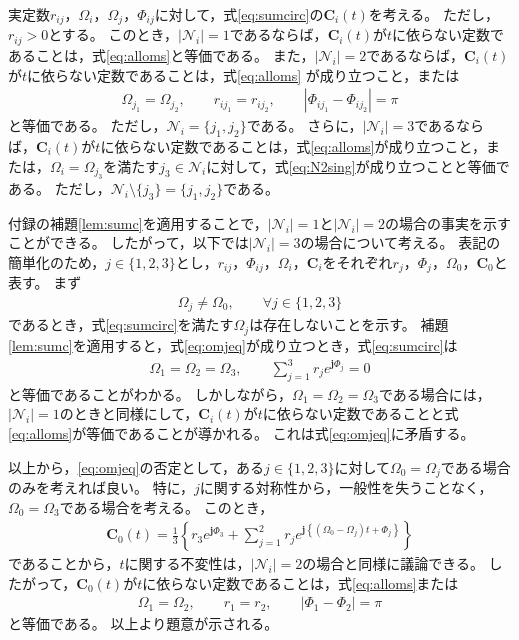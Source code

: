 \documentclass[tombow,dvipdfmx]{corona-a5-1.1}
\begin{document}
\begin{補題}[電力バランス方程式から導かれるバスの同期]
\label{lem:sumc2}
実定数$r_{ij}$，$\Omega_i$，$\Omega_j$，$\Phi_{ij}$に対して，式\ref{eq:sumcirc}の$\bm{C}_i (t)$を考える。
ただし，$r_{ij}>0$とする。
このとき，$|\mathcal{N}_i|=1$であるならば，$\bm{C}_i (t)$が$t$に依らない定数であることは，式\ref{eq:alloms}と等価である。
また，$|\mathcal{N}_i|=2$であるならば，$\bm{C}_i (t)$が$t$に依らない定数であることは，式\ref{eq:alloms}
が成り立つこと，または
\begin{align}\label{eq:N2sing}
\Omega_{j_1} = \Omega_{j_2}
,\qquad
r_{i j_1} = r_{i j_2}
,\qquad
|\Phi_{i j_1}-\Phi_{i j_2}| = \pi
\end{align}
と等価である。
ただし，$\mathcal{N}_i = \{j_1,j_2\}$である。
さらに，$|\mathcal{N}_i|=3$であるならば，$\bm{C}_i (t)$が$t$に依らない定数であることは，式\ref{eq:alloms}が成り立つこと，または，$\Omega_{i} = \Omega_{j_3}$を満たす$j_3 \in \mathcal{N}_i$に対して，式\ref{eq:N2sing}が成り立つことと等価である。
ただし，$ \mathcal{N}_i \setminus \{j_3\}=\{j_1,j_2\}$である。
\end{補題}

\begin{証明}
付録の補題\ref{lem:sumc}を適用することで，$|\mathcal{N}_i|=1$と$|\mathcal{N}_i|=2$の場合の事実を示すことができる。
したがって，以下では$|\mathcal{N}_i|=3$の場合について考える。
表記の簡単化のため，$j \in\{1,2,3\}$とし，$r_{ij}$，$\Phi_{ij}$，$\Omega_i$，$\bm{C}_i$をそれぞれ$r_{j}$，$\Phi_{j}$，$\Omega_0$，$\bm{C}_0$と表す。
まず
\begin{align}\label{eq:omjeq}
\Omega_j \neq \Omega_0
,\qquad \forall j \in \{1,2,3\}
\end{align}
であるとき，式\ref{eq:sumcirc}を満たす$\Omega_j$は存在しないことを示す。
補題\ref{lem:sumc}を適用すると，式\ref{eq:omjeq}が成り立つとき，式\ref{eq:sumcirc}は
\begin{align*}
\Omega_1 = \Omega_2 = \Omega_3,\qquad
\sum_{j=1}^3 
r_j e^{\bm{j} \Phi_j}=0
\end{align*}
と等価であることがわかる。
しかしながら，$\Omega_1 = \Omega_2 = \Omega_3$である場合には，$|\mathcal{N}_i|=1$のときと同様にして，$\bm{C}_i (t)$が$t$に依らない定数であることと式\ref{eq:alloms}が等価であることが導かれる。
これは式\ref{eq:omjeq}に矛盾する。

以上から，\ref{eq:omjeq}の否定として，ある$j\in\{1,2,3\}$に対して$\Omega_0=\Omega_j$である場合のみを考えれば良い。
特に，$j$に関する対称性から，一般性を失うことなく，$\Omega_0=\Omega_3$である場合を考える。
このとき，
\begin{align*}
\bm{C}_0 (t) = \frac{1}{3} \left\{
r_3 e^{\bm{j} \Phi_3}
+
\sum_{j=1}^2
r_{j}
e^{\bm{j} 
\left\{
(\Omega_0 - \Omega_j)t + 
\Phi_{j}
\right\} }
\right\}
\end{align*}
であることから，$t$に関する不変性は，$|\mathcal{N}_i|=2$の場合と同様に議論できる。
したがって，$\bm{C}_0 (t)$が$t$に依らない定数であることは，式\ref{eq:alloms}または
\begin{align*}
\Omega_{1} = \Omega_{2}
,\qquad
r_{1} = r_{2}
,\qquad
|\Phi_{1}-\Phi_{2}| = \pi
\end{align*}
と等価である。
以上より題意が示される。
\end{証明}
\end{document}
